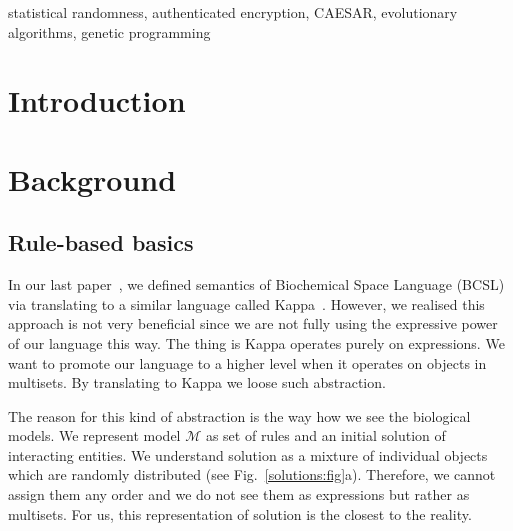 \documentclass[12pt]{fithesis2}
\begin{document}
\begin{ThesisKeyWords}
statistical randomness, authenticated encryption, CAESAR, evolutionary algorithms, genetic programming
\end{ThesisKeyWords}

\MainMatter
\tableofcontents

\chapter{Introduction}

\chapter{Background}
\section{Rule-based basics}
\label{Rule-based basics}

In our last paper~\cite{Ded201627}, we defined semantics of Biochemical Space Language (BCSL) via translating to a similar language called Kappa~\cite{Kappa}. However, we realised this approach is not very beneficial since we are not fully using the expressive power of our language this way. The thing is Kappa operates purely on expressions. We want to promote our language to a higher level when it operates on objects in multisets. By translating to Kappa we loose such abstraction. 

The reason for this kind of abstraction is the way how we see the biological models. We represent model $\mathcal{M}$ as set of rules and an initial solution of interacting entities. We understand solution as a mixture of individual objects which are randomly distributed (see Fig.~\ref{solutions:fig}a). Therefore, we cannot assign them any order and we do not see them as expressions but rather as multisets. For us, this representation of solution is the closest to the reality.
\end{document}
